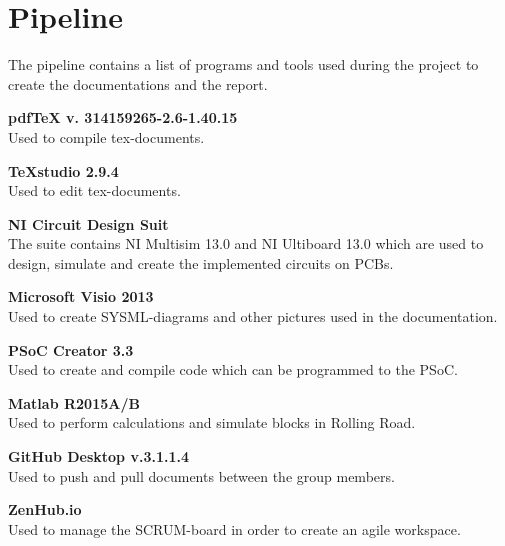 \chapter{Pipeline}
The pipeline contains a list of programs and tools used during the project to create the documentations and the report.

\textbf{pdfTeX v. 314159265-2.6-1.40.15}\\
Used to compile tex-documents.

\textbf{TeXstudio 2.9.4}\\
Used to edit tex-documents.

\textbf{NI Circuit Design Suit}\\
The suite contains NI Multisim 13.0 and NI Ultiboard 13.0 which are used to design, simulate and create the implemented circuits on PCBs.

\textbf{Microsoft Visio 2013}\\
Used to create SYSML-diagrams and other pictures used in the documentation.

\textbf{PSoC Creator 3.3}\\
Used to create and compile code which can be programmed to the PSoC.

\textbf{Matlab R2015A/B}\\
Used to perform calculations and simulate blocks in Rolling Road.

\textbf{GitHub Desktop v.3.1.1.4}\\
Used to push and pull documents between the group members.

\textbf{ZenHub.io}\\
Used to manage the SCRUM-board in order to create an agile workspace.